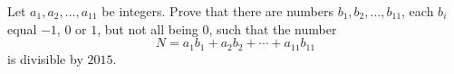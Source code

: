 \documentclass[varwidth]{standalone}
\begin{document}
    Let $a_1, a_2, \dots, a_{11}$ be integers. Prove that there are numbers $b_1, b_2, \dots, b_{11}$, each $b_i$ equal $-1$, $0$ or $1$, but not all being $0$, such that the number
    \[
        N = a_1 b_1 + a_2 b_2 + \dotsb + a_{11} b_{11}  
    \]
    is divisible by $2015$.
\end{document}
